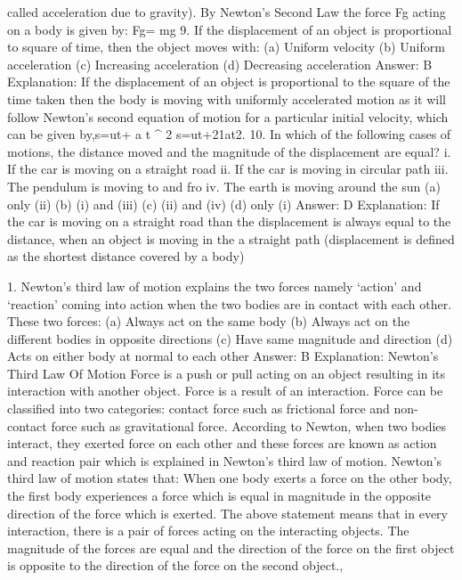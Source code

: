 called acceleration due to gravity).
By Newton's Second Law the force {\displaystyle {}
}Fg acting on a body is given by:
Fg= mg
9. If the displacement of an object is proportional to square of
time, then the object moves with:
(a) Uniform velocity
(b) Uniform acceleration
(c) Increasing acceleration
(d) Decreasing acceleration
Answer: B
Explanation: If the displacement of an object is proportional to the
square of the time taken then the body is moving with uniformly
accelerated motion as it will follow Newton's second equation of
motion for a particular initial velocity, which can be given
by,s=ut+ a{ t }^{ 2 }s=ut+21at2.
10. In which of the following cases of motions, the distance
moved and the magnitude of the displacement are equal?
i. If the car is moving on a straight road
ii. If the car is moving in circular path
iii. The pendulum is moving to and fro
iv. The earth is moving around the sun
(a) only (ii)
(b) (i) and (iii)
(c) (ii) and (iv)
(d) only (i)
Answer: D
Explanation: If the car is moving on a straight road than the
displacement is always equal to the distance, when an object is
moving in the a straight path (displacement is defined as the
shortest distance covered by a body)


1. Newton’s third law of motion explains the two forces namely
‘action’ and ‘reaction’ coming into action when the two bodies are
in contact with each other. These two forces:
(a) Always act on the same body
(b) Always act on the different bodies in opposite directions
(c) Have same magnitude and direction
(d) Acts on either body at normal to each other
Answer: B
Explanation: Newton’s Third Law Of Motion Force is a push or pull
acting on an object resulting in its interaction with another object.
Force is a result of an interaction. Force can be classified into two
categories: contact force such as frictional force and non-contact
force such as gravitational force. According to Newton, when two
bodies interact, they exerted force on each other and these forces
are known as action and reaction pair which is explained in Newton’s
third law of motion.
Newton’s third law of motion states that: When one body exerts a
force on the other body, the first body experiences a force which is
equal in magnitude in the opposite direction of the force which is
exerted.
The above statement means that in every interaction, there is a pair
of forces acting on the interacting objects. The magnitude of the
forces are equal and the direction of the force on the first object is
opposite to the direction of the force on the second object., 


